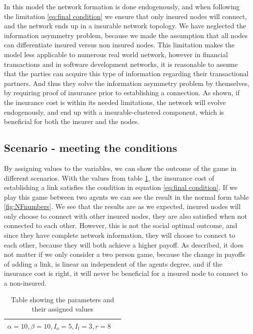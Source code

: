 In this model the network formation is done endogenously, and when following the limitation \ref{eq:final condition} we ensure that only insured nodes will connect, and the network ends up in a insurable network topology. 
We have neglected the information asymmetry problem, because we made the assumption that all nodes can differentiate insured versus non insured nodes. This limitation makes the model less applicable to numerous real world network, however in financial transactions and in software development networks, it is reasonable to assume that the parties can acquire this type of information regarding their transactional partners. And thus they solve the information asymmetry problem by themselves, by requiring proof of insurance prior to establishing a connection. 
As shown, if the insurance cost is within its needed limitations, the network will evolve endogenously, and end up with a insurable-clustered component, which is beneficial for both the insurer and the nodes.

\subsection{Scenario - meeting the conditions}
By assigning values to the variables, we can show the outcome of the game in different scenarios. With the values from table \ref{tbl:simplegamevalue}, the insurance cost of establishing a link satisfies the condition in equation \ref{eq:final condition}.
If we play this game between two agents we can see the result in the normal form table \ref{fig:NFnumbers}. 
We see that the results are as we expected, insured nodes will only choose to connect with other insured nodes, they are also satisfied when not connected to each other. However, this is not the social optimal outcome, and since they have complete network information, they will choose to connect to each other, because they will both achieve a higher payoff.
As described, it does not matter if we only consider a two person game, because the change in payoffs of adding a link, is linear an independent of the agents degree, and if the insurance cost is right, it will never be beneficial for a insured node to connect to a non-insured. 

\begin{table}[h]
\centering
\begin{tabular}{lc}
 \hline
  $\alpha=10,
  \beta=10,
  I_{o}=5,
  I_{l}=3,
  r=8$\\
  \hline
\end{tabular}
\caption{Table showing the parameters and their assigned values \label{tbl:simplegamevalue}}
\end{table}

